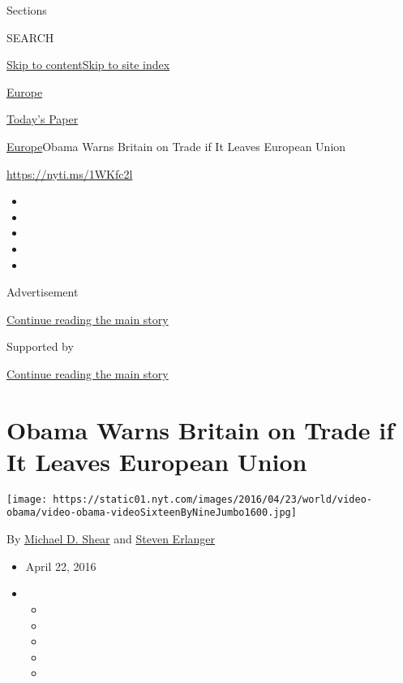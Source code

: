 Sections

SEARCH

\protect\hyperlink{site-content}{Skip to
content}\protect\hyperlink{site-index}{Skip to site index}

\href{https://www.nytimes.com/section/world/europe}{Europe}

\href{https://myaccount.nytimes.com/auth/login?response_type=cookie\&client_id=vi}{}

\href{https://www.nytimes.com/section/todayspaper}{Today's Paper}

\href{/section/world/europe}{Europe}\textbar{}Obama Warns Britain on
Trade if It Leaves European Union

\url{https://nyti.ms/1WKfc2l}

\begin{itemize}
\item
\item
\item
\item
\item
\end{itemize}

Advertisement

\protect\hyperlink{after-top}{Continue reading the main story}

Supported by

\protect\hyperlink{after-sponsor}{Continue reading the main story}

\hypertarget{obama-warns-britain-on-trade-if-it-leaves-european-union}{%
\section{Obama Warns Britain on Trade if It Leaves European
Union}\label{obama-warns-britain-on-trade-if-it-leaves-european-union}}

\texttt{[image: https://static01.nyt.com/images/2016/04/23/world/video-obama/video-obama-videoSixteenByNineJumbo1600.jpg]}

By \href{http://www.nytimes.com/by/michael-d-shear}{Michael D. Shear}
and \href{http://www.nytimes.com/by/steven-erlanger}{Steven Erlanger}

\begin{itemize}
\item
  April 22, 2016
\item
  \begin{itemize}
  \item
  \item
  \item
  \item
  \item
  \end{itemize}
\end{itemize}

